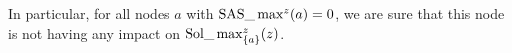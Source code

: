 In particular, for all nodes $a$ with $\mathrm{SAS}\_\max\nolimits^z(a)=0$, 
we are sure that this node is not having any impact on $\mathrm{Sol}\_\max_{\{a\}}^z(z)$. 

	
%	
	
% 			


 



